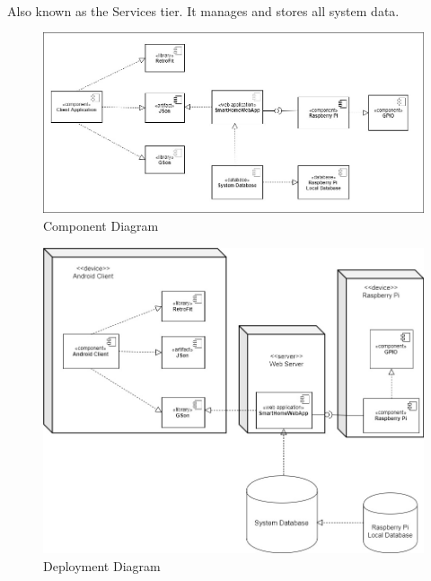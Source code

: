 \documentclass[12pt, oneside, a4paper]{book}
\begin{document}
		\paragraph{} Also known as the Services tier. It manages and stores all system data.
		\begin{figure}[H]
			\centering
			\includegraphics[width=\linewidth]{img/diagram_component.jpg}
			\caption{Component Diagram}
			\label{fig:diagrm_component}
		\end{figure}
		\begin{figure}[H]
			\centering
			\includegraphics[width=\linewidth]{img/diagram_deployment.jpg}
			\caption{Deployment Diagram}
			\label{fig:diagram_deployment}
		\end{figure}
\end{document}
